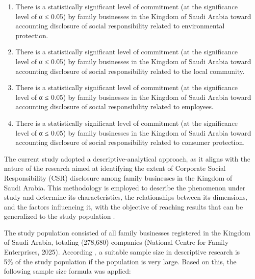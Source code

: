 \documentclass[10pt]{NSP1}
\begin{document}
\begin{enumerate}
  \item There is a statistically significant level of commitment (at the significance level of α ≤ 0.05) by family businesses in the Kingdom of Saudi Arabia toward accounting disclosure of social responsibility related to environmental protection.
  \item There is a statistically significant level of commitment (at the significance level of α ≤ 0.05) by family businesses in the Kingdom of Saudi Arabia toward accounting disclosure of social responsibility related to the local community.
  \item There is a statistically significant level of commitment (at the significance level of α ≤ 0.05) by family businesses in the Kingdom of Saudi Arabia toward accounting disclosure of social responsibility related to employees.
  \item There is a statistically significant level of commitment (at the significance level of α ≤ 0.05) by family businesses in the Kingdom of Saudi Arabia toward accounting disclosure of social responsibility related to consumer protection.
\end{enumerate}

\par\vspace{6.0pt}\vspace{12.0pt}

The current study adopted a descriptive-analytical approach, as it aligns with the nature of the research aimed at identifying the extent of Corporate Social Responsibility (CSR) disclosure among family businesses in the Kingdom of Saudi Arabia. This methodology is employed to describe the phenomenon under study and determine its characteristics, the relationships between its dimensions, and the factors influencing it, with the objective of reaching results that can be generalized to the study population \cite{ref32}.

\par\vspace{6.0pt}\vspace{12.0pt}

The study population consisted of all family businesses registered in the Kingdom of Saudi Arabia, totaling (278,680) companies (National Centre for Family Enterprises, 2025). According \cite{ref33}, a suitable sample size in descriptive research is 5\% of the study population if the population is very large. Based on this, the following sample size formula was applied:
\end{document}
